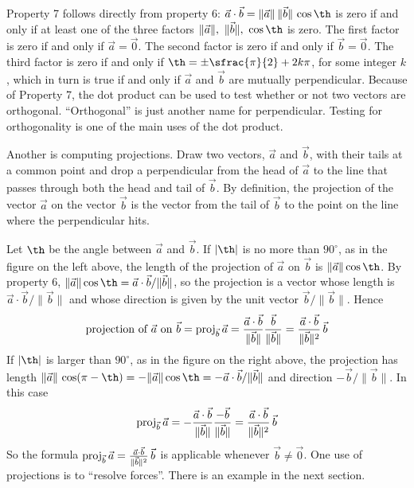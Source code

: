Property 7 follows directly from property 6: $\vec a\cdot\vec b=\|\vec a\|\,\|\vec b\|\,\cos\th$
is zero if and only if at least one of the three factors 
$\|\vec a\|,\ \|\vec b\|,\ \cos\th$ is zero. The first factor is zero if
and only if $\vec a=\vec 0$. The second factor is zero if and only if 
$\vec b=\vec 0$.
The third factor is zero if and only if $\th=\pm\sfrac{\pi}{2}+2k\pi$,
for some integer $k$, which in turn is true if and only if $\vec a$ and 
$\vec b$ are mutually perpendicular. Because of Property 7,
the dot product can be used to test whether or not two vectors are 
orthogonal. ``Orthogonal'' is just another name for perpendicular.
Testing for orthogonality is one of the main uses of the
dot product. 

Another is computing projections.  Draw two vectors, $\vec a$ and $\vec b$,
with their tails at a common point and drop a perpendicular from the head of
$\vec a$ to the line that passes through both the head and tail of $\vec b$. 
By definition, the projection of the vector $\vec a$
on the vector $\vec b$ is the vector from the tail of $\vec b$ to the point
on the line where the perpendicular hits.\hfill\break
\centerline{}
Let $\th$ be the angle between $\vec a$ and $\vec b$. If $|\th|$ is no
more than $90^\circ$, as in the figure on the left above, 
the length of the projection of $\vec a$ on $\vec b$ is 
$\|\vec a\|\cos\th$.
By property 6,  $\|\vec a\|\cos\th=\vec a\cdot\vec b/\|\vec b\|$, so the
projection is a vector whose length is $\vec a\cdot\vec b/\|\vec b\|$ and
whose direction is given by the unit vector $\vec b/\|\vec b\|$. Hence
$$
\hbox{projection of $\vec a$ on $\vec b$}={\rm proj}_{\vec b}\,\vec a
=\frac{\vec a\cdot\vec b}{\|\vec b\|}\frac{\vec b}{\|\vec b\|}
=\frac{\vec a\cdot\vec b}{\|\vec b\|^2}\,\vec b
$$
If $|\th|$ is larger than $90^\circ$, as in the figure on the right above, the projection has length 
$\|\vec a\|\,\cos(\pi-\th)=-\|\vec a\|\cos\th=-\vec a\cdot\vec b/\|\vec b\|$
 and direction $-\vec b/\|\vec b\|$. In this case
$$
{\rm proj}_{\vec b}\,\vec a
=-\frac{\vec a\cdot\vec b}{\|\vec b\|}\frac{-\vec b}{\|\vec b\|}
=\frac{\vec a\cdot\vec b}{\|\vec b\|^2}\,\vec b
$$
So the formula ${\rm proj}_{\vec b}\,\vec a
=\frac{\vec a\cdot\vec b}{\|\vec b\|^2}\,\vec b$ is applicable whenever
$\vec b\ne\vec 0$.
One use of projections is to ``resolve forces''. There is an example in
the next section.
